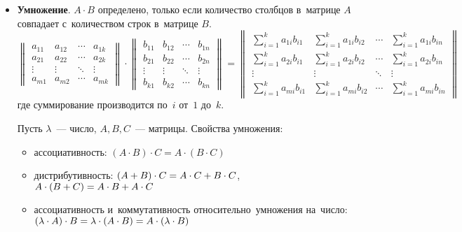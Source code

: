 \begin{itemize}
	\item\textbf{Умножение}. $A \cdot B$ определено, только если количество столбцов в~матрице $A$ совпадает с~количеством строк в~матрице $B$.
	\begin{equation*}
	\begin{Vmatrix}
	a_{11} & a_{12} & \cdots & a_{1k} \\ 
	a_{21} & a_{22} & \cdots & a_{2k} \\ 
	\vdots & \vdots & \ddots & \vdots \\ 
	a_{m1} & a_{m2} & \cdots & a_{mk}
	\end{Vmatrix} \cdot
	\begin{Vmatrix}
	b_{11} & b_{12} & \cdots & b_{1n} \\ 
	b_{21} & b_{22} & \cdots & b_{2n} \\ 
	\vdots & \vdots & \ddots & \vdots \\ 
	b_{k1} & b_{k2} & \cdots & b_{kn}
	\end{Vmatrix} =
	\begin{Vmatrix}
	\sum\limits_{i=1}^k a_{1i}b_{i1} & \sum\limits_{i=1}^k a_{1i}b_{i2} & \cdots & \sum\limits_{i=1}^k a_{1i}b_{in} \\
	\sum\limits_{i=1}^k a_{2i}b_{i1} & \sum\limits_{i=1}^k a_{2i}b_{i2} & \cdots & \sum\limits_{i=1}^k a_{2i}b_{in} \\
	\vdots & \vdots & \ddots & \vdots \\
	\sum\limits_{i=1}^k a_{mi}b_{i1} & \sum\limits_{i=1}^k a_{mi}b_{i2} & \cdots & \sum\limits_{i=1}^k a_{mi}b_{in}
	\end{Vmatrix}
	\end{equation*}
	где суммирование производится по~$i$ от~$1$ до~$k$.
	
	Пусть $\lambda$~--- число, $A, B, C$~--- матрицы. Свойства умножения:
	\begin{itemize}
		\item ассоциативность:
		$(A \cdot B) \cdot C = A \cdot (B \cdot C)$
		\item дистрибутивность:
		$(A + B) \cdot C \opbr= A \cdot C + B \cdot C$,
		$A \cdot (B + C) \opbr= A \cdot B + A \cdot C$
		\item ассоциативность и~коммутативность относительно~умножения на~число:
		$(\lambda \cdot A) \cdot B \opbr= \lambda \cdot (A \cdot B) \opbr= A \cdot (\lambda \cdot B)$
	\end{itemize}
\end{itemize}